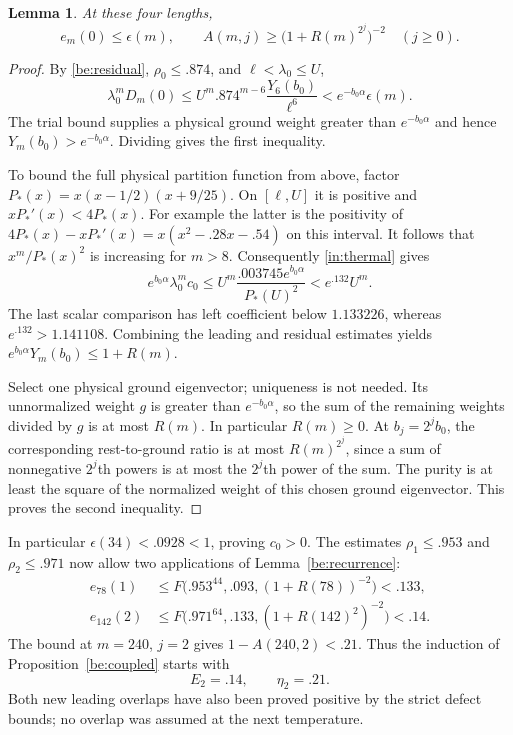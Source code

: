\documentclass[11pt]{article}
\newtheorem{lemma}[theorem]{Lemma}
\theoremstyle{remark}
\numberwithin{equation}{section}
\begin{document}
\begin{lemma}\label{in:seedbounds}
At these four lengths,
\begin{equation}\label{in:seedineq}
 e_m(0)\le\epsilon(m),\qquad
 A(m,j)\ge\bigl(1+R(m)^{2^j}\bigr)^{-2}\quad(j\ge0).
\end{equation}
\end{lemma}
\begin{proof}
By \eqref{be:residual}, $\rho_0\le.874$, and
$\ell<\lambda_0\le U$,
\[
 \lambda_0^mD_m(0)
 \le U^m .874^{m-6}\frac{Y_6(b_0)}{\ell^6}
 <e^{-b_0\alpha}\epsilon(m).
\]
The trial bound supplies a physical ground weight greater than
$e^{-b_0\alpha}$ and hence $Y_m(b_0)>e^{-b_0\alpha}$.
Dividing gives the first inequality.

To bound the full physical partition function from above, factor
$P_*(x)=x(x-1/2)(x+9/25)$. On $[\ell,U]$ it is positive and
$xP_*'(x)<4P_*(x)$. For example the latter is the positivity of
$4P_*(x)-xP_*'(x)=x(x^2-.28x-.54)$ on this interval.
It follows that $x^m/P_*(x)^2$ is increasing for $m>8$.
Consequently \eqref{in:thermal} gives
\[
 e^{b_0\alpha}\lambda_0^mc_0
 \le U^m\frac{.003745e^{b_0\alpha}}{P_*(U)^2}
 <e^{.132}U^m.
\]
The last scalar comparison has left coefficient below $1.133226$,
whereas $e^{.132}>1.141108$. Combining the leading and residual
estimates yields $e^{b_0\alpha}Y_m(b_0)\le1+R(m)$.

Select one physical ground eigenvector; uniqueness is not needed.
Its unnormalized weight $g$ is greater than $e^{-b_0\alpha}$, so
the sum of the remaining weights divided by $g$ is at most $R(m)$.
In particular $R(m)\ge0$. At $b_j=2^jb_0$, the corresponding
rest-to-ground ratio is at most $R(m)^{2^j}$, since a sum of
nonnegative $2^j$th powers is at most the $2^j$th power of the sum.
The purity is at least the square of the normalized weight of this
chosen ground eigenvector. This proves the second inequality.
\end{proof}

In particular $\epsilon(34)<.0928<1$, proving $c_0>0$.
The estimates $\rho_1\le.953$ and $\rho_2\le.971$ now allow
two applications of Lemma~\ref{be:recurrence}:
\begin{align}
 e_{78}(1)&\le F\bigl(.953^{44},.093,(1+R(78))^{-2}\bigr)<.133,
                                                     \label{in:78}\\
 e_{142}(2)&\le F\bigl(.971^{64},.133,(1+R(142)^2)^{-2}\bigr)<.14.
                                                     \label{in:142}
\end{align}
The bound at $m=240$, $j=2$ gives $1-A(240,2)<.21$.
Thus the induction of Proposition~\ref{be:coupled} starts with
\begin{equation}\label{in:initial}
 E_2=.14,\qquad\eta_2=.21.
\end{equation}
Both new leading overlaps have also been proved positive by the strict
defect bounds; no overlap was assumed at the next temperature.
\end{document}
